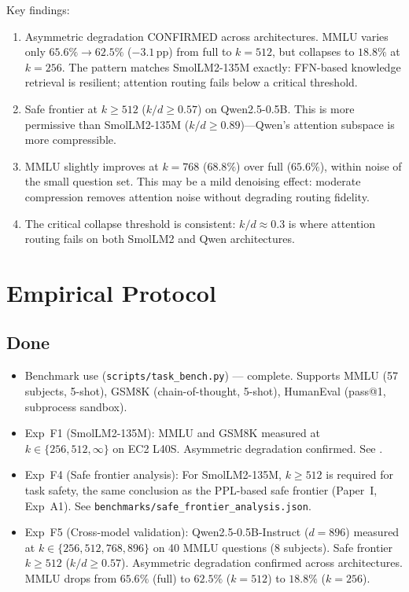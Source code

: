 \documentclass[11pt]{article}
\begin{document}
Key findings:
\begin{enumerate}
\item Asymmetric degradation CONFIRMED across architectures.  MMLU
      varies only $65.6\%{\to}62.5\%$ ($-3.1$\,pp) from full to
      $k{=}512$, but collapses to $18.8\%$ at $k{=}256$.  The pattern
      matches SmolLM2-135M exactly: FFN-based knowledge retrieval is
      resilient; attention routing fails below a critical threshold.
\item Safe frontier at $k{\ge}512$ ($k/d{\ge}0.57$) on Qwen2.5-0.5B.
      This is more permissive than SmolLM2-135M
      ($k/d{\ge}0.89$)---Qwen's attention subspace is more compressible.
\item MMLU slightly improves at $k{=}768$ ($68.8\%$) over
      full ($65.6\%$), within noise of the small question set.  This
      may be a mild denoising effect: moderate compression removes
      attention noise without degrading routing fidelity.
\item The critical collapse threshold is consistent:
      $k/d \approx 0.3$ is where attention routing fails on both
      SmolLM2 and Qwen architectures.
\end{enumerate}

\section{Empirical Protocol}
\label{sec:protocol}

\subsection{Done}
\begin{itemize}
\item Benchmark use (\texttt{scripts/task\_bench.py}) --- complete.
      Supports MMLU (57 subjects, 5-shot), GSM8K (chain-of-thought,
      5-shot), HumanEval (pass@1, subprocess sandbox).
\item Exp~F1 (SmolLM2-135M): MMLU and GSM8K measured at
      $k\in\{256,512,\infty\}$ on EC2 L40S.  Asymmetric degradation
      confirmed.  See .
\item Exp~F4 (Safe frontier analysis): For SmolLM2-135M,
      $k{\ge}512$ is required for task safety, the same conclusion
      as the PPL-based safe frontier (Paper~I, Exp~A1).
      See \texttt{benchmarks/safe\_frontier\_analysis.json}.
\item Exp~F5 (Cross-model validation): Qwen2.5-0.5B-Instruct
      ($d{=}896$) measured at $k\in\{256,512,768,896\}$ on 40 MMLU
      questions (8 subjects).  Safe frontier $k{\ge}512$
      ($k/d{\ge}0.57$).  Asymmetric degradation confirmed across
      architectures.  MMLU drops from $65.6\%$ (full) to $62.5\%$
      ($k{=}512$) to $18.8\%$ ($k{=}256$).
\end{itemize}
\end{document}
